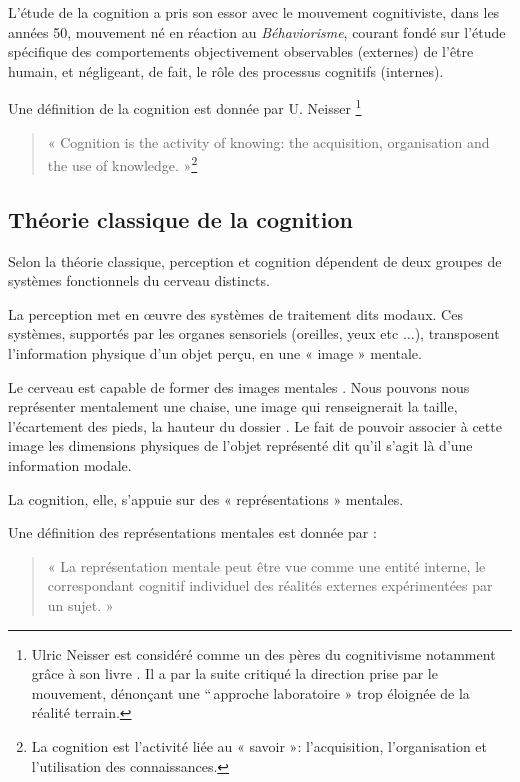 L'étude de la cognition a pris son essor avec le mouvement cognitiviste, dans les années 50, mouvement né en réaction au \emph{Béhaviorisme}, courant fondé sur l'étude spécifique des comportements objectivement observables (externes) de l'être humain, et négligeant, de fait, le rôle des processus cognitifs (internes).

Une définition de la cognition est donnée par U. Neisser \citep[p. 1]{neisser1976cognition}\footnote{Ulric Neisser est considéré comme un des pères du cognitivisme notamment grâce à son livre \citep{neisser1967cognitive}. Il a par la suite critiqué la direction prise par le mouvement, dénonçant une ``\,approche laboratoire » trop éloignée de la réalité terrain.}

\begin{quote}
\item « Cognition is the activity of knowing: the acquisition, organisation and the use of knowledge. »\footnote{La cognition est l'activité liée au « savoir »: l'acquisition, l'organisation et l'utilisation des connaissances.}
\end{quote}

\subsection{Théorie classique de la cognition}
\label{sec:ch3_classicCognition}

Selon la théorie classique, perception et cognition dépendent de deux groupes de systèmes fonctionnels du cerveau distincts. 

La perception met en œuvre des systèmes de traitement dits modaux. Ces systèmes, supportés par les organes sensoriels (oreilles, yeux etc $\ldots$), transposent l'information physique d'un objet perçu, en une « image » mentale.

Le cerveau est capable de former des images mentales \citep{barsalou2003situated,martin2001functional}. Nous pouvons nous représenter mentalement une chaise, une image qui renseignerait la taille, l'écartement des pieds, la hauteur du dossier \etc. Le fait de pouvoir associer à cette image les dimensions physiques de l'objet représenté dit qu'il s'agit là d'une information modale.

La cognition, elle, s'appuie sur des « représentations » mentales.

Une définition des représentations mentales est donnée par \citep{houde1998vocabulaire}:

\begin{quote}
« La représentation mentale peut être vue comme une entité interne, le correspondant cognitif individuel des réalités externes expérimentées par un sujet. »
\end{quote}

